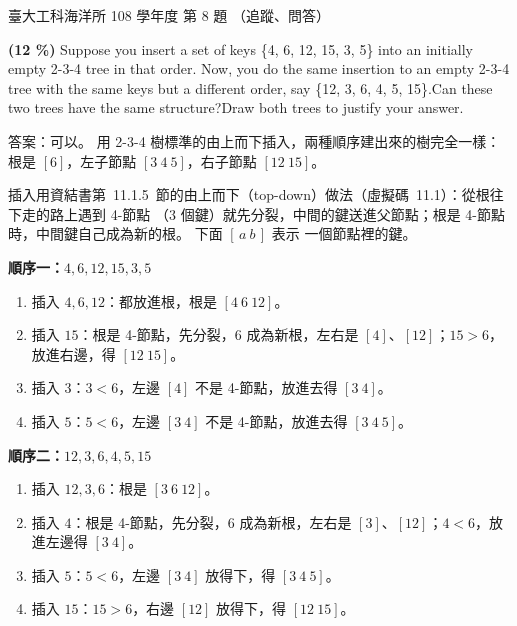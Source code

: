 \begin{pastexam}[label={px:ntu-108-esoe-ds-08}]{臺大工科海洋所 108 學年度 第 8 題}
（追蹤、問答）

\textbf{(12 \%)} Suppose you insert a set of keys \{4, 6, 12, 15, 3, 5\} into an initially empty 2-3-4
tree in that order. Now, you do the same insertion to an empty 2-3-4 tree with the same keys but a
different order, say \{12, 3, 6, 4, 5, 15\}.\quad Can these two trees have the same
structure?\quad Draw both trees to justify your answer.
\end{pastexam}

\begin{pastsoln}
答案：可以。 用 2-3-4 樹標準的由上而下插入，兩種順序建出來的樹完全一樣：根是 $[6]$，左子節點
$[3\ 4\ 5]$，右子節點 $[12\ 15]$。

插入用資結書第~11.1.5~節的由上而下（top-down）做法（虛擬碼~11.1）：從根往下走的路上遇到 4-節點
（$3$ 個鍵）就先分裂，中間的鍵送進父節點；根是 4-節點時，中間鍵自己成為新的根。 下面 $[\,a\ b\,]$ 表示
一個節點裡的鍵。

\textbf{順序一：$4, 6, 12, 15, 3, 5$}
\begin{enumerate}
\item 插入 $4, 6, 12$：都放進根，根是 $[4\ 6\ 12]$。
\item 插入 $15$：根是 4-節點，先分裂，$6$ 成為新根，左右是 $[4]$、$[12]$；$15 > 6$，放進右邊，得 $[12\ 15]$。
\item 插入 $3$：$3 < 6$，左邊 $[4]$ 不是 4-節點，放進去得 $[3\ 4]$。
\item 插入 $5$：$5 < 6$，左邊 $[3\ 4]$ 不是 4-節點，放進去得 $[3\ 4\ 5]$。
\end{enumerate}

\textbf{順序二：$12, 3, 6, 4, 5, 15$}
\begin{enumerate}
\item 插入 $12, 3, 6$：根是 $[3\ 6\ 12]$。
\item 插入 $4$：根是 4-節點，先分裂，$6$ 成為新根，左右是 $[3]$、$[12]$；$4 < 6$，放進左邊得 $[3\ 4]$。
\item 插入 $5$：$5 < 6$，左邊 $[3\ 4]$ 放得下，得 $[3\ 4\ 5]$。
\item 插入 $15$：$15 > 6$，右邊 $[12]$ 放得下，得 $[12\ 15]$。
\end{enumerate}


\end{pastsoln}
